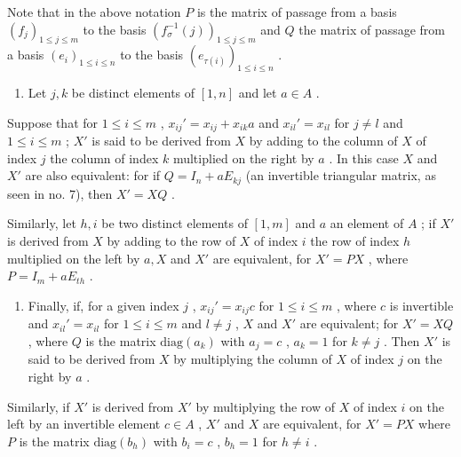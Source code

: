Note that in the above notation \(P\) is the matrix of passage from a basis \((f_j)_{1 \leqslant j \leqslant m}\) to the basis \((f_\sigma^{-1}(j))_{1 \leqslant j \leqslant m}\) and \(Q\) the matrix of passage from a basis \((e_i)_{1 \leqslant i \leqslant n}\) to the basis \((e_{\tau(i)})_{1 \leqslant i \leqslant n}\) .

\begin{enumerate}
\def\labelenumi{(\arabic{enumi})}
\setcounter{enumi}{1}
\tightlist
\item
  Let \(j, k\) be distinct elements of \([1, n]\) and let \(a \in A\) .
\end{enumerate}

Suppose that for \(1 \leqslant i \leqslant m\) , \(x_{ij}' = x_{ij} + x_{ik}a\) and \(x_{il}' = x_{il}\) for \(j \neq l\) and \(1 \leqslant i \leqslant m\) ; \(X'\) is said to be derived from \(X\) by adding to the column of \(X\) of index \(j\) the column of index \(k\) multiplied on the right by \(a\) . In this case \(X\) and \(X'\) are also equivalent: for if \(Q = I_n + aE_{kj}\) (an invertible triangular matrix, as seen in no. 7), then \(X' = XQ\) .

Similarly, let \(h, i\) be two distinct elements of \([1, m]\) and \(a\) an element of \(A\) ; if \(X'\) is derived from \(X\) by adding to the row of \(X\) of index \(i\) the row of index \(h\) multiplied on the left by \(a, X\) and \(X'\) are equivalent, for \(X' = PX\) , where \(P = I_m + aE_{th}\) .

\begin{enumerate}
\def\labelenumi{(\arabic{enumi})}
\setcounter{enumi}{2}
\tightlist
\item
  Finally, if, for a given index \(j\) , \(x_{ij}' = x_{ij}c\) for \(1 \leqslant i \leqslant m\) , where \(c\) is invertible and \(x_{il}' = x_{il}\) for \(1 \leqslant i \leqslant m\) and \(l \neq j\) , \(X\) and \(X'\) are equivalent; for \(X' = XQ\) , where \(Q\) is the matrix \(\text{diag}(a_k)\) with \(a_j = c\) , \(a_k = 1\) for \(k \neq j\) . Then \(X'\) is said to be derived from \(X\) by multiplying the column of \(X\) of index \(j\) on the right by \(a\) .
\end{enumerate}

Similarly, if \(X'\) is derived from \(X'\) by multiplying the row of \(X\) of index \(i\) on the left by an invertible element \(c \in A\) , \(X'\) and \(X\) are equivalent, for \(X' = PX\) where \(P\) is the matrix \(\text{diag}(b_h)\) with \(b_i = c\) , \(b_h = 1\) for \(h \neq i\) .

